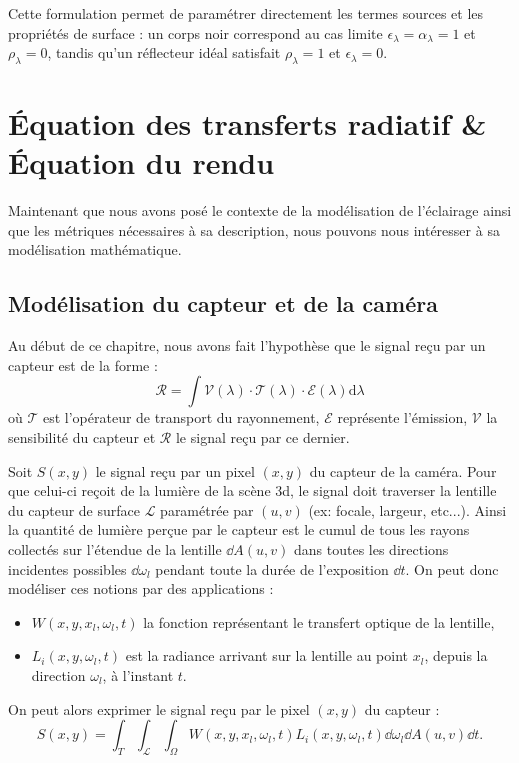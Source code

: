 Cette formulation permet de paramétrer directement les termes sources et les propriétés de surface : un corps noir correspond au cas limite $\epsilon_\lambda = \alpha_\lambda = 1$ et $\rho_\lambda = 0$, tandis qu'un réflecteur idéal satisfait $\rho_\lambda = 1$ et $\epsilon_\lambda = 0$.


\section{Équation des transferts radiatif \& Équation du rendu}

Maintenant que nous avons posé le contexte de la modélisation de l'éclairage ainsi que les métriques nécessaires à sa description, nous pouvons nous intéresser à sa modélisation mathématique. 

\subsection{Modélisation du capteur et de la caméra}

Au début de ce chapitre, nous avons fait l'hypothèse que le signal reçu par un capteur est de la forme : 
\begin{equation}
    \mathcal{R} = \int \mathcal{V}( \lambda) \cdot \mathcal{T}( \lambda) \cdot \mathcal{E}( \lambda)\mathrm{d} \lambda
\end{equation}
où $ \mathcal{T}$ est l'opérateur de transport du rayonnement, $ \mathcal{E}$ représente l'émission, $ \mathcal{V}$ la sensibilité du capteur et $ \mathcal{R}$ le signal reçu par ce dernier. 

\begin{proposition}
    Soit $S(x,y)$ le signal reçu par un pixel $(x,y)$ du capteur de la caméra. Pour que celui-ci reçoit de la lumière de la scène 3d, le signal doit traverser la lentille du capteur de surface $\mathcal{L}$ paramétrée par $(u,v)$ (ex: focale, largeur, etc...). Ainsi la quantité de lumière perçue par le capteur est le cumul de tous les rayons collectés sur l'étendue de la lentille $ \dd A(u,v)$ dans toutes les directions incidentes possibles $ \dd \omega_l$ pendant toute la durée de l'exposition $ \dd t$. 
    On peut donc modéliser ces notions par des applications : 
    \begin{itemize}
        \item $W(x, y, x_l, \omega_l, t)$ la fonction représentant le transfert optique de la lentille, 
        \item $L_i(x, y, \omega_l, t)$ est la radiance arrivant sur la lentille au point $x_l$, depuis la direction $\omega_l$, à l'instant $t$. 
    \end{itemize}
    On peut alors exprimer le signal reçu par le pixel $(x,y)$ du capteur :
    \begin{equation}
        S(x,y) = \int_T \int_\mathcal{L} \int_\Omega W(x, y, x_l, \omega_l, t) L_i(x, y, \omega_l, t) \dd \omega_l \dd A(u,v) \dd t. 
    \end{equation}
\end{proposition}

